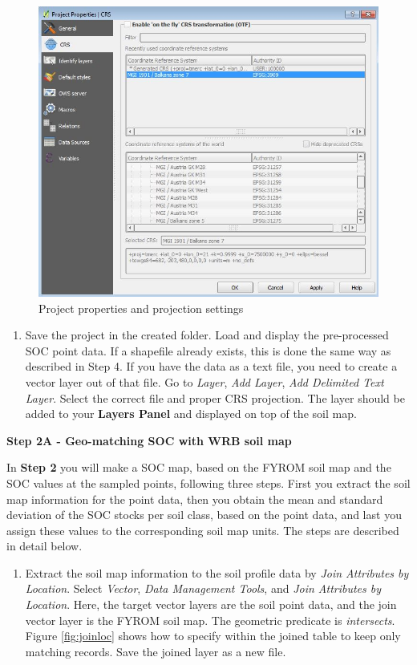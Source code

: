 \documentclass[10pt,b5paper,]{book}
\providecommand{\tightlist}{%
  \setlength{\itemsep}{0pt}\setlength{\parskip}{0pt}}
\theoremstyle{definition}
\theoremstyle{definition}
\theoremstyle{definition}
\theoremstyle{remark}
\begin{document}
\begin{figure}

{\centering \includegraphics[width=0.8\linewidth]{images/Conv_upscaling3} 

}

\caption{Project properties and projection settings}\label{fig:qgisepsg}
\end{figure}

\begin{enumerate}
\def\labelenumi{\arabic{enumi}.}
\setcounter{enumi}{6}
\tightlist
\item
  Save the project in the created folder. Load and display the
  pre-processed SOC point data. If a shapefile already exists, this is
  done the same way as described in Step 4. If you have the data as a
  text file, you need to create a vector layer out of that file. Go to
  \emph{Layer}, \emph{Add Layer}, \emph{Add Delimited Text Layer}.
  Select the correct file and proper CRS projection. The layer should be
  added to your \textbf{Layers Panel} and displayed on top of the soil
  map.
\end{enumerate}

\textbf{Step 2A - Geo-matching SOC with WRB soil map}

In \textbf{Step 2} you will make a SOC map, based on the FYROM soil map
and the SOC values at the sampled points, following three steps. First
you extract the soil map information for the point data, then you obtain
the mean and standard deviation of the SOC stocks per soil class, based
on the point data, and last you assign these values to the corresponding
soil map units. The steps are described in detail below.

\begin{enumerate}
\def\labelenumi{\arabic{enumi}.}
\tightlist
\item
  Extract the soil map information to the soil profile data by
  \emph{Join Attributes by Location}. Select \emph{Vector}, \emph{Data
  Management Tools}, and \emph{Join Attributes by Location}. Here, the
  target vector layers are the soil point data, and the join vector
  layer is the FYROM soil map. The geometric predicate is
  \emph{intersects}. Figure \ref{fig:joinloc} shows how to specify
  within the joined table to keep only matching records. Save the joined
  layer as a new file.
\end{enumerate}
\end{document}
